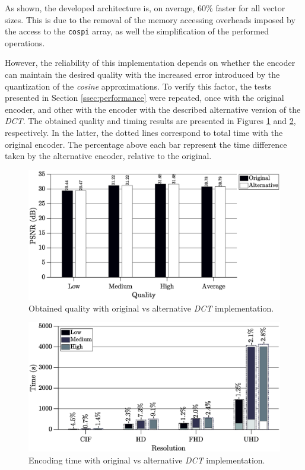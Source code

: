 As shown, the developed architecture is, on average, $60\%$ faster for all vector sizes. This is due to the removal of the memory accessing overheads imposed by the access to the \texttt{cospi} array, as well the simplification of the performed operations. 

However, the reliability of this implementation depends on whether the encoder can maintain the desired quality with the increased error introduced by the quantization of the \emph{cosine} approximations. To verify this factor, the tests presented in Section \ref{ssec:performance} were repeated, once with the original encoder, and other with the encoder with the described alternative version of the \emph{DCT}. The obtained quality and timing results are presented in Figures \ref{fig:buttqual} and \ref{fig:butttime}, respectively. In the latter, the dotted lines correspond to total time with the original encoder. The percentage above each bar represent the time difference taken by the alternative encoder, relative to the original.

\begin{figure}[!htb]
    \centering
    \includegraphics[width=\textwidth]{Sections/4DevelopedArchitecture/Figures/buttmultqual.eps}
    \caption{Obtained quality with original vs alternative \emph{DCT} implementation.}
    \label{fig:buttqual}
\end{figure}

\begin{figure}[!htb]
    \centering
    \includegraphics[width=\textwidth]{Sections/4DevelopedArchitecture/Figures/buttmulttime.eps}
    \caption{Encoding time with original vs alternative \emph{DCT} implementation.}
    \label{fig:butttime}
\end{figure}

